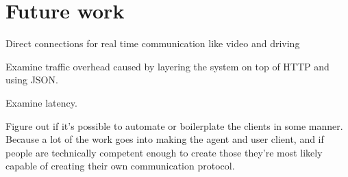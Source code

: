 \section{Future work}

Direct connections for real time communication like video and driving

Examine traffic overhead caused by layering the system on top of HTTP and using JSON.

Examine latency.

Figure out if it's possible to automate or boilerplate the clients in some manner.
Because a lot of the work goes into making the agent and user client, and if people are technically competent enough to create those they're most likely capable of creating their own communication protocol.

